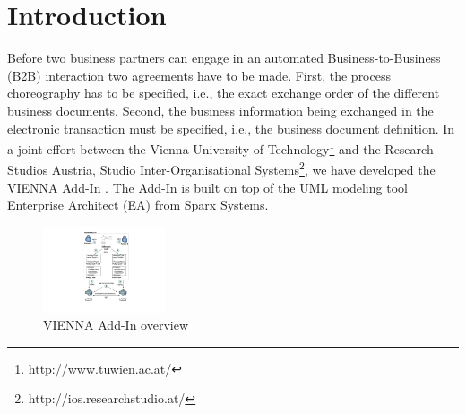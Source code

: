 \documentclass{acm_proc_article-sp}
\begin{document}
\section{Introduction}
Before two business partners can engage in an automated Business-to-Business (B2B) interaction two agreements have to be made. First, the process choreography has to be specified, i.e., the exact exchange order of the different business documents. Second, the business information being exchanged in the electronic transaction must be specified, i.e., the business document definition. In a joint effort between the Vienna University of Technology\footnote{http://www.tuwien.ac.at/} and the Research Studios Austria, Studio Inter-Organisational Systems\footnote{http://ios.researchstudio.at/}, we have developed the VIENNA Add-In \cite{man:VIENNAAddIn}. The Add-In is built on top of the UML modeling tool Enterprise Architect (EA) from Sparx Systems. %
\begin{figure}[htbp]
 \centering
   \includegraphics[width=0.32\textwidth]{figures/addinoverview.pdf}
 \caption{VIENNA Add-In overview}
 \label{fig:viennaaddinoverview}
\end{figure}
\end{document}
